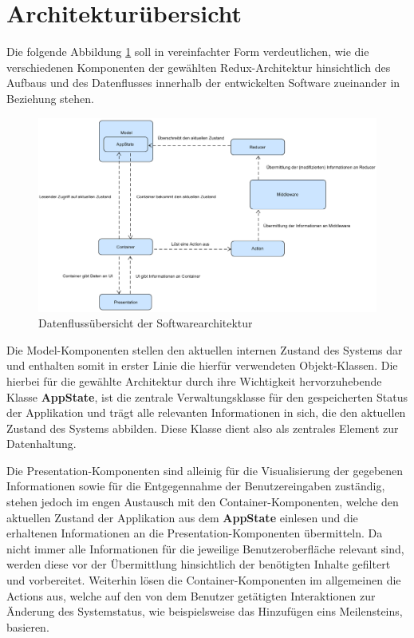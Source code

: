 \documentclass[bibliography=totoc,listof=totoc,BCOR=5mm,DIV=12,oneside]{scrbook}
\begin{document}
\newpage
\section{Architekturübersicht}
\par Die folgende Abbildung \ref{img:architectureOverview} soll in vereinfachter Form verdeutlichen, wie die verschiedenen Komponenten der gewählten Redux-Architektur hinsichtlich des Aufbaus und des Datenflusses innerhalb der entwickelten Software zueinander in Beziehung stehen. 

\bigskip
\begin{figure}[H]
	\centering
	\includegraphics[width=1\textwidth,keepaspectratio]{Bilder/ArchitectureOverview.png}
	\caption{Datenflussübersicht der Softwarearchitektur}
	\label{img:architectureOverview}
\end{figure}

\par \bigskip Die Model-Komponenten stellen den aktuellen internen Zustand des Systems dar und enthalten somit in erster Linie die hierfür verwendeten Objekt-Klassen. Die hierbei für die gewählte Architektur durch ihre Wichtigkeit hervorzuhebende Klasse \textbf{AppState}, ist die zentrale Verwaltungsklasse für den gespeicherten Status der Applikation und trägt alle relevanten Informationen in sich, die den aktuellen Zustand des Systems abbilden. Diese Klasse dient also als zentrales Element zur Datenhaltung.

\par \bigskip Die Presentation-Komponenten sind alleinig für die Visualisierung der gegebenen Informationen sowie für die Entgegennahme der Benutzereingaben zuständig, stehen jedoch im engen Austausch mit den Container-Komponenten, welche den aktuellen Zustand der Applikation aus dem \textbf{AppState} einlesen und die erhaltenen Informationen an die Presentation-Komponenten übermitteln. Da nicht immer alle Informationen für die jeweilige Benutzeroberfläche relevant sind, werden diese vor der Übermittlung hinsichtlich der benötigten Inhalte gefiltert und vorbereitet. Weiterhin lösen die Container-Komponenten im allgemeinen die Actions aus, welche auf den von dem Benutzer getätigten Interaktionen zur Änderung des Systemstatus, wie beispielsweise das Hinzufügen eins Meilensteins, basieren.
\end{document}

